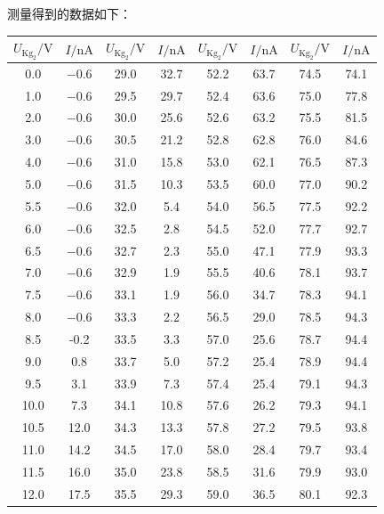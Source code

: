 \documentclass[a4paper,fontset=windows]{ctexart}
\begin{document}
    测量得到的数据如下：
    \begin{center}\Large
    \begin{longtable}{ cccccccc }
        \toprule[0.1em]
        $U_{\mathrm{Kg_2}}/\mathrm{V}$ & $I/\mathrm{nA}$ & $U_{\mathrm{Kg_2}}/\mathrm{V}$ & $I/\mathrm{nA}$ & $U_{\mathrm{Kg_2}}/\mathrm{V}$ & $I/\mathrm{nA}$ & $U_{\mathrm{Kg_2}}/\mathrm{V}$ & $I/\mathrm{nA}$ \\
        \midrule[0.06em]
        0.0  & $-0.6$ & 29.0 & 32.7 & 52.2 & 63.7 & 74.5 & 74.1  \\
        1.0  & $-0.6$ & 29.5 & 29.7 & 52.4 & 63.6 & 75.0 & 77.8  \\
        2.0  & $-0.6$ & 30.0 & 25.6 & 52.6 & 63.2 & 75.5 & 81.5  \\
        3.0  & $-0.6$ & 30.5 & 21.2 & 52.8 & 62.8 & 76.0 & 84.6  \\
        4.0  & $-0.6$ & 31.0 & 15.8 & 53.0 & 62.1 & 76.5 & 87.3  \\
        5.0  & $-0.6$ & 31.5 & 10.3 & 53.5 & 60.0 & 77.0 & 90.2  \\
        5.5  & $-0.6$ & 32.0 & 5.4  & 54.0 & 56.5 & 77.5 & 92.2  \\
        6.0  & $-0.6$ & 32.5 & 2.8  & 54.5 & 52.0 & 77.7 & 92.7  \\
        6.5  & $-0.6$ & 32.7 & 2.3  & 55.0 & 47.1 & 77.9 & 93.3  \\
        7.0  & $-0.6$ & 32.9 & 1.9  & 55.5 & 40.6 & 78.1 & 93.7  \\
        7.5  & $-0.6$ & 33.1 & 1.9  & 56.0 & 34.7 & 78.3 & 94.1  \\
        8.0  & $-0.6$ & 33.3 & 2.2  & 56.5 & 29.0 & 78.5 & 94.3  \\
        8.5  &  -0.2  & 33.5 & 3.3  & 57.0 & 25.6 & 78.7 & 94.4  \\
        9.0  &  0.8   & 33.7 & 5.0  & 57.2 & 25.4 & 78.9 & 94.4  \\
        9.5  &  3.1   & 33.9 & 7.3  & 57.4 & 25.4 & 79.1 & 94.3  \\
        10.0 &  7.3   & 34.1 & 10.8 & 57.6 & 26.2 & 79.3 & 94.1  \\
        10.5 &  12.0  & 34.3 & 13.3 & 57.8 & 27.2 & 79.5 & 93.8  \\
        11.0 &  14.2  & 34.5 & 17.0 & 58.0 & 28.4 & 79.7 & 93.4  \\
        11.5 &  16.0  & 35.0 & 23.8 & 58.5 & 31.6 & 79.9 & 93.0  \\
        12.0 &  17.5  & 35.5 & 29.3 & 59.0 & 36.5 & 80.1 & 92.3  \\

\end{longtable}
\end{center}
\end{document}
